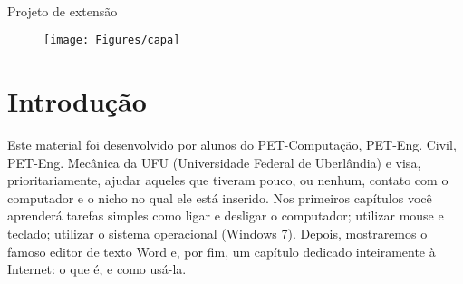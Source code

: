\documentclass[hidelinks,12pt]{article}
\newcommand{\bigicon}[1]{\texttt{[image: \#1]}}
\newcommand{\iconb}[1]{\texttt{[image: \#1]}}
\begin{document}
\pagestyle{fancy}


\begin{center}
	\\
	\vspace{0.5cm}\large{Projeto de extensão}
\end{center}

\lhead{\bigicon{Figures/ufu}}
\rhead{\bigicon{Figures/facom}}
\lfoot{}
\cfoot{}
\rfoot{}
\vspace{1cm}
\begin{figure}[!h]
	\centering
	\texttt{[image: Figures/capa]}

\end{figure}


\newpage
\fancyhead[C]{}
\fancyhead[R]{\iconb{Figures/comppet}}
\fancyhead[L]{\leftmark}
\fancyfoot{}
\fancyfoot[C]{\hspace{3.0cm}\thepage}


\tableofcontents
\listoffigures

{\let\thefootnote\relax{}}

{\let\thefootnote\relax{}}


{\let\thefootnote\relax{}}


\newpage

\section{Introdução}

 Este material foi desenvolvido por alunos do PET-Computação, PET-Eng. Civil, PET-Eng. Mecânica da UFU (Universidade Federal de Uberlândia) e visa, prioritariamente, ajudar aqueles que tiveram pouco, ou nenhum, contato com o computador e o nicho no qual ele está inserido. Nos primeiros capítulos você aprenderá tarefas simples como ligar e desligar o computador; utilizar mouse e teclado; utilizar o sistema operacional (Windows 7). Depois, mostraremos o famoso editor de texto Word e, por fim, um capítulo dedicado inteiramente à Internet: o que é, e como usá-la.
 
\end{document}
